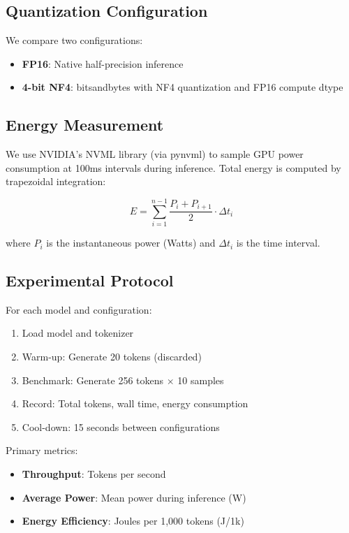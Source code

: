 \documentclass[11pt]{article}
\begin{document}
\subsection{Quantization Configuration}

We compare two configurations:
\begin{itemize}
    \item \textbf{FP16}: Native half-precision inference
    \item \textbf{4-bit NF4}: bitsandbytes \cite{dettmers2023qlora} with NF4 quantization and FP16 compute dtype
\end{itemize}

\subsection{Energy Measurement}

We use NVIDIA's NVML library (via pynvml) to sample GPU power consumption at 100ms intervals during inference. Total energy is computed by trapezoidal integration:

\begin{equation}
E = \sum_{i=1}^{n-1} \frac{P_i + P_{i+1}}{2} \cdot \Delta t_i
\end{equation}

where $P_i$ is the instantaneous power (Watts) and $\Delta t_i$ is the time interval.

\subsection{Experimental Protocol}

For each model and configuration:
\begin{enumerate}
    \item Load model and tokenizer
    \item Warm-up: Generate 20 tokens (discarded)
    \item Benchmark: Generate 256 tokens $\times$ 10 samples
    \item Record: Total tokens, wall time, energy consumption
    \item Cool-down: 15 seconds between configurations
\end{enumerate}

Primary metrics:
\begin{itemize}
    \item \textbf{Throughput}: Tokens per second
    \item \textbf{Average Power}: Mean power during inference (W)
    \item \textbf{Energy Efficiency}: Joules per 1,000 tokens (J/1k)
\end{itemize}
\end{document}
